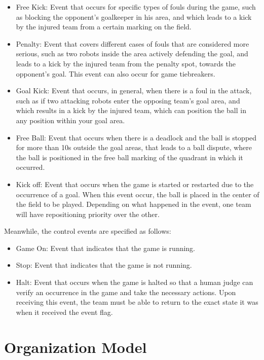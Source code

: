 \begin{itemize}
    \item Free Kick: Event that occurs for specific types of fouls during the game, such as blocking the opponent's goalkeeper in his area, and which leads to a kick by the injured team from a certain marking on the field.
    \item Penalty: Event that covers different cases of fouls that are considered more serious, such as two robots inside the area actively defending the goal, and leads to a kick by the injured team from the penalty spot, towards the opponent's goal. This event can also occur for game tiebreakers.
    \item Goal Kick: Event that occurs, in general, when there is a foul in the attack, such as if two attacking robots enter the opposing team's goal area, and which results in a kick by the injured team, which can position the ball in any position within your goal area.
    \item Free Ball: Event that occurs when there is a deadlock and the ball is stopped for more than 10s outside the goal areas, that leads to a ball dispute, where the ball is positioned in the free ball marking of the quadrant in which it occurred.
    \item Kick off: Event that occurs when the game is started or restarted due to the occurrence of a goal. When this event occur, the ball is placed in the center of the field to be played. Depending on what happened in the event, one team will have repositioning priority over the other.
 \end{itemize}

Meanwhile, the control events are specified as follows:

\begin{itemize}
     \item Game On: Event that indicates that the game is running.
     \item Stop: Event that indicates that the game is not running.
     \item Halt: Event that occurs when the game is halted so that a human judge can verify an occurrence in the game and take the necessary actions. Upon receiving this event, the team must be able to return to the exact state it was when it received the event flag.
  \end{itemize}

\section{Organization Model}
\label{sec:organization_model}

